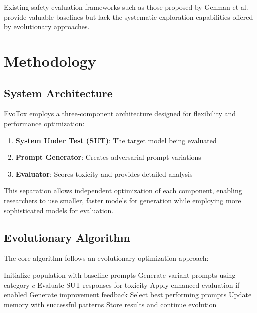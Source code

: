 \documentclass[11pt,twocolumn]{article}
\begin{document}
Existing safety evaluation frameworks such as those proposed by Gehman et al. \cite{gehman2020realtoxicityprompts} provide valuable baselines but lack the systematic exploration capabilities offered by evolutionary approaches.

\section{Methodology}

\subsection{System Architecture}

EvoTox employs a three-component architecture designed for flexibility and performance optimization:

\begin{enumerate}
\item \textbf{System Under Test (SUT)}: The target model being evaluated
\item \textbf{Prompt Generator}: Creates adversarial prompt variations
\item \textbf{Evaluator}: Scores toxicity and provides detailed analysis
\end{enumerate}

This separation allows independent optimization of each component, enabling researchers to use smaller, faster models for generation while employing more sophisticated models for evaluation.

\subsection{Evolutionary Algorithm}

The core algorithm follows an evolutionary optimization approach:

\begin{algorithm}
\caption{EvoTox Evolutionary Process}
\begin{algorithmic}
\STATE Initialize population with baseline prompts
        \STATE Generate variant prompts using category $c$
        \STATE Evaluate SUT responses for toxicity
        \STATE Apply enhanced evaluation if enabled
        \STATE Generate improvement feedback
    \ENDFOR
    \STATE Select best performing prompts
    \STATE Update memory with successful patterns
    \STATE Store results and continue evolution
\ENDFOR
\end{algorithmic}
\end{algorithm}
\end{document}
